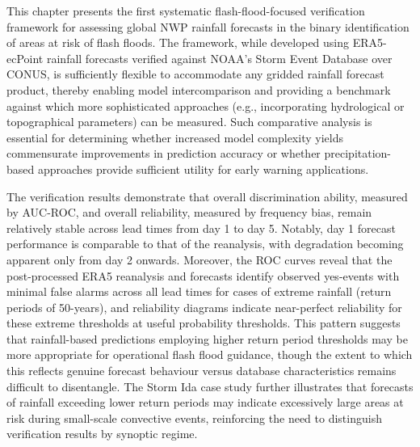 This  chapter presents the first systematic flash-flood-focused verification framework for assessing global NWP rainfall forecasts in the binary identification of areas at risk of flash floods. The framework, while developed using ERA5-ecPoint rainfall forecasts verified against NOAA's Storm Event Database over CONUS, is sufficiently flexible to accommodate any gridded rainfall forecast product, thereby enabling model intercomparison and providing a benchmark against which more sophisticated approaches (e.g., incorporating hydrological or topographical parameters) can be measured. Such comparative analysis is essential for determining whether increased model complexity yields commensurate improvements in prediction accuracy or whether precipitation-based approaches provide sufficient utility for early warning applications.

The  verification results demonstrate that overall discrimination ability, measured by AUC-ROC, and overall reliability, measured by frequency bias, remain relatively stable across lead times from day 1 to day 5. Notably, day 1 forecast performance is comparable to that of the reanalysis, with degradation becoming apparent only from day 2 onwards. Moreover, the ROC curves reveal that the post-processed ERA5 reanalysis and forecasts identify observed yes-events with minimal false alarms across all lead times for cases of extreme rainfall (return periods of 50-years), and reliability diagrams indicate near-perfect reliability for these extreme thresholds at useful probability thresholds. This pattern suggests that rainfall-based predictions employing higher return period thresholds may be more appropriate for operational flash flood guidance, though the extent to which this reflects genuine forecast behaviour versus database characteristics remains difficult to disentangle. The Storm Ida case study further illustrates that forecasts of rainfall exceeding lower return periods may indicate excessively large areas at risk during small-scale convective events, reinforcing the need to distinguish verification results by synoptic regime.

